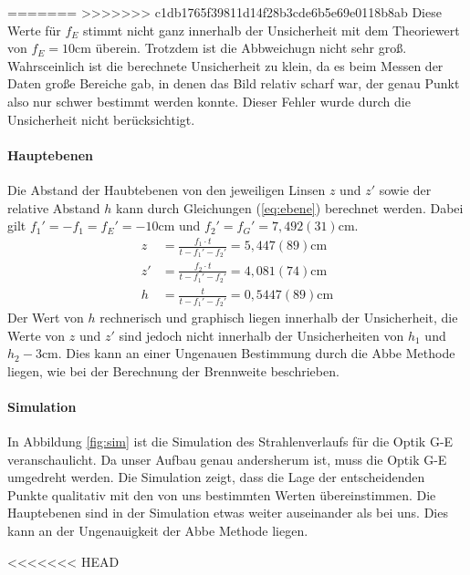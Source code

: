 \documentclass[11pt, a4paper]{article}
\begin{document}
=======
>>>>>>> c1db1765f39811d14f28b3cde6b5e69e0118b8ab
    Diese Werte für $f_E$ stimmt nicht ganz innerhalb der Unsicherheit mit dem Theoriewert von $f_E = 10 \si{\centi\metre}$ überein. Trotzdem ist die Abbweichugn nicht sehr groß. Wahrsceinlich ist die berechnete Unsicherheit zu klein, da es beim Messen der Daten große Bereiche gab, in denen das Bild relativ scharf war, der genau Punkt also nur schwer bestimmt werden konnte. Dieser Fehler wurde durch die Unsicherheit nicht berücksichtigt.

    \paragraph{Hauptebenen}
    Die Abstand der Haubtebenen von den jeweiligen Linsen $z$ und $z'$ sowie der relative Abstand $h$ kann durch Gleichungen (\ref{eq:ebene}) berechnet werden. Dabei gilt $f_1' = -f_1 = f_E' = -10 \si{\centi\metre}$ und $f_2' = f_G' = 7,492(31) \si{\centi\metre}$.
    \begin{align}
        z &= \frac{f_1 \cdot t}{t - f_1' - f_2'} = 5,447(89) \si{\centi\metre} \\
        z' &= \frac{f_2 \cdot t}{t - f_1' - f_2'} = 4,081(74) \si{\centi\metre} \\
        h &= \frac{t}{t - f_1' - f_2'} = 0,5447(89) \si{\centi\metre}
    \end{align}
    Der Wert von $h$ rechnerisch und graphisch liegen innerhalb der Unsicherheit, die Werte von $z$ und $z'$ sind jedoch nicht innerhalb der Unsicherheiten von $h_1$ und $h_2 - 3 \si{\centi\metre}$. Dies kann an einer Ungenauen Bestimmung durch die Abbe Methode liegen, wie bei der Berechnung der Brennweite beschrieben.

    \paragraph{Simulation}
    In Abbildung \ref{fig:sim} ist die Simulation des Strahlenverlaufs für die Optik G-E veranschaulicht. Da unser Aufbau genau andersherum ist, muss die Optik G-E umgedreht werden. Die Simulation zeigt, dass die Lage der entscheidenden Punkte qualitativ mit den von uns bestimmten Werten übereinstimmen. Die Hauptebenen sind in der Simulation etwas weiter auseinander als bei uns. Dies kann an der Ungenauigkeit der Abbe Methode liegen.

<<<<<<< HEAD
\end{document}
